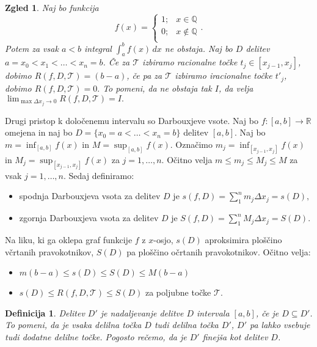 \documentclass[10pt, a4paper]{article}
\newtheorem{defi}{Definicija}[section]
\newenvironment{noticeB}{%
  \tcolorbox[%
  notitle,
  empty,
  enhanced,  %
  breakable,
  coltext=black,
  colback=white, 
  fontupper=\rmfamily,
  parbox=false,
  noparskip,
  sharp corners,
  boxrule=-1pt,  %
  frame hidden,
  left=7pt,  %
  right=7pt,
  top=5pt,
  bottom=5pt,
  before skip=2.5ex plus 2pt,
  after skip=2.5ex plus 2pt,
  borderline west = {1.5pt}{-0.1pt}{blue!30!black}, %
  overlay unbroken and last={%
    \draw[color=black, line width=1.25pt]
    ($(frame.south west)+(1.pt, -0.1pt)$) -- ++(2em, 0);
  }
  ]}
{\endtcolorbox}
\newenvironment{definicija}{\begin{defi}\begin{noticeB}}{%
    \end{noticeB}\end{defi}}
\newtheorem{zgled}{Zgled}[section]
\newcommand{\Q}{\mathbb {Q}}
\newcommand{\R}{\mathbb {R}}
\newcommand{\limf}[3]{\lim_{#1 \to #2} {#3}}
\begin{document}
\begin{zgled}
    Naj bo funkcija $$f(x) = \begin{cases}
        1 ;& x \in \Q\\
        0;& x \notin \Q\\
    \end{cases}.$$ Potem za vsak $a < b$ integral $\int_a ^b f(x)\,dx$ ne obstaja.
    Naj bo $D$ delitev $a = x_0 < x_1 < \dots < x_n = b$.
    Če za $\mathcal{T}$ izbiramo racionalne točke $t_j \in [x_{j-1}, x_j]$, dobimo $R(f, D, \mathcal{T}) = (b-a)$, 
    če pa za $\mathcal{T}$ izbiramo iracionalne točke $t'_j$, dobimo $R(f, D, \mathcal{T}) = 0.$
    To pomeni, da ne obstaja tak $I$, da velja $\limf{\max \Delta x_j}{0}{R(f, D, \mathcal{T})} = I.$
\end{zgled}

Drugi pristop k določenemu intervalu so Darbouxjeve vsote.
Naj bo $f: [a, b] \rightarrow \R$ omejena in naj bo $D = \{x_0 = a < \dots < x_n = b\}$ delitev $[a, b]$.
Naj bo $m = \inf_{[a,b]} f(x)$ in $M = \sup_{[a,b]} f(x)$.
Označimo $m_j = \inf_{[x_{j-1}, x_j]} f(x)$ in $M_j = \sup_{[x_{j-1}, x_j]} f(x)$ za $j = 1, \dots, n$.
Očitno velja $m \leq m_j \leq M_j \leq M$ za vsak $j = 1, \dots, n$.
Sedaj definiramo:
\begin{itemize}
    \item spodnja Darbouxjeva vsota za delitev $D$ je
    $s(f, D) = \sum_1 ^n m_j \Delta x_j = s(D),$
    \item zgornja Darbouxjeva vsota za delitev $D$ je
    $S(f, D) = \sum_1 ^n M_j \Delta x_j = S(D).$
\end{itemize}
Na liku, ki ga oklepa graf funkcije $f$ z $x$-osjo, $s(D)$ aproksimira ploščino včrtanih pravokotnikov, $S(D)$ pa ploščino očrtanih pravokotnikov.
Očitno velja:
\begin{itemize}
    \item $m(b - a) \leq s(D) \leq S(D) \leq M(b-a)$
    \item $s(D) \leq R(f, D, \mathcal{T}) \leq S(D)$ za poljubne točke $\mathcal{T}$.
\end{itemize}

\begin{definicija}
    Delitev $D'$ je nadaljevanje delitve $D$ intervala $[a, b]$, če je $D \subseteq D'$.
    To pomeni, da je vsaka delilna točka $D$ tudi delilna točka $D'$, $D'$ pa lahko vsebuje tudi dodatne delilne točke.
    Pogosto rečemo, da je $D'$ finejša kot delitev $D$.
\end{definicija}
\end{document}

